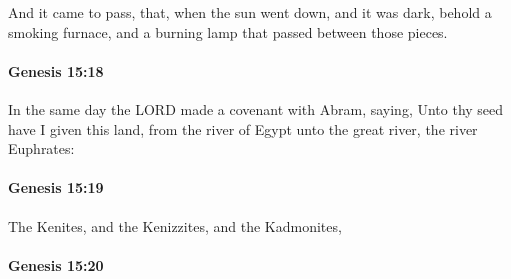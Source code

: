 			And it came to pass, that, when the sun went down, and it was dark, behold a smoking furnace, and a burning lamp that passed between those pieces.


		\paragraph{Genesis 15:18} %
			\label{GENESIS-15-18}

			In the same day the LORD made a covenant with Abram, saying, Unto thy seed have I given this land, from the river of Egypt unto the great river, the river Euphrates:


		\paragraph{Genesis 15:19} %
			\label{GENESIS-15-19}

			The Kenites, and the Kenizzites, and the Kadmonites,


		\paragraph{Genesis 15:20} %
			\label{GENESIS-15-20}

